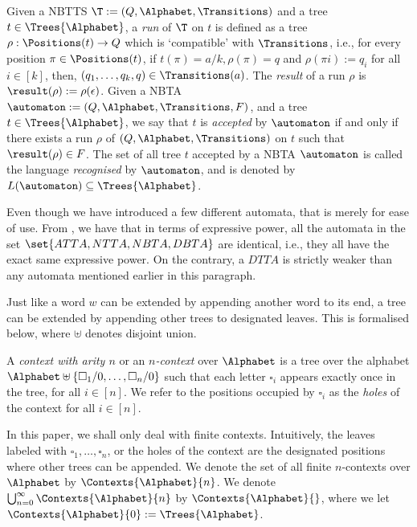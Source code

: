 \begin{definition}\label{def:acceptanceByNbta}
  Given a NBTTS $\T := (Q, \Alphabet, \Transitions)$ and a tree $t \in \Trees{\Alphabet}$, a \emph{run} of $\T$ on $t$ is defined as a tree $\rho : \Positions(t) \to Q$ which is `compatible' with $\Transitions$, i.e., for every position $\pi \in \Positions(t)$, if $t(\pi) = a/k, \rho(\pi) = q$ and $\rho(\pi i) := q_i$ for all $i \in [k]$, then, $(q_1, \dots, q_k, q) \in \Transitions(a)$. The \emph{result} of a run $\rho$ is $\result(\rho) := \rho(\epsilon)$. Given a NBTA $\automaton := (Q, \Alphabet, \Transitions, F)$, and a tree $t \in \Trees{\Alphabet}$, we say that $t$ is \emph{accepted} by $\automaton$ if and only if there exists a run $\rho$ of $(Q, \Alphabet, \Transitions)$ on $t$ such that $\result(\rho) \in F$. The set of all tree $t$ accepted by a NBTA $\automaton$ is called the language \emph{recognised} by $\automaton$, and is denoted by $L(\automaton) \subseteq \Trees{\Alphabet}$.
\end{definition}

Even though we have introduced a few different automata, that is merely for ease of use. From \cite{tata}, we have that in terms of expressive power, all the automata in the set $\set{ATTA, NTTA, NBTA, DBTA}$ are identical, i.e., they all have the exact same expressive power. On the contrary, a $DTTA$ is strictly weaker than any automata mentioned earlier in this paragraph.

Just like a word $w$ can be extended by appending another word to its end, a tree can be extended by appending other trees to designated leaves. This is formalised below, where $ \uplus$ denotes disjoint union.

\begin{definition}[Context]\label{def:context}
  A \emph{context with arity $n$} or an \emph{$n$-context} over $\Alphabet$ is a tree over the alphabet $\Alphabet \uplus \{\square_1/0, \dots, \square_n/0\}$ such that each letter $\square_i$ appears exactly once in the tree, for all $i \in [n]$. We refer to the positions occupied by $\square_i$ as the \emph{holes} of the context for all $i \in [n]$.
\end{definition}

In this paper, we shall only deal with finite contexts. Intuitively,
the leaves labeled with $\square_1, \dots, \square_n$, or the holes of
the context are the designated positions where other trees can be
appended. We denote the set of all finite $n$-contexts over
$\Alphabet$ by $\Contexts{\Alphabet}{n}$. We denote $\bigcup_{n=0}^\infty
\Contexts{\Alphabet}{n}$ by $\Contexts{\Alphabet}{}$, where we let $\Contexts{\Alphabet}{0}
:= \Trees{\Alphabet}$.

